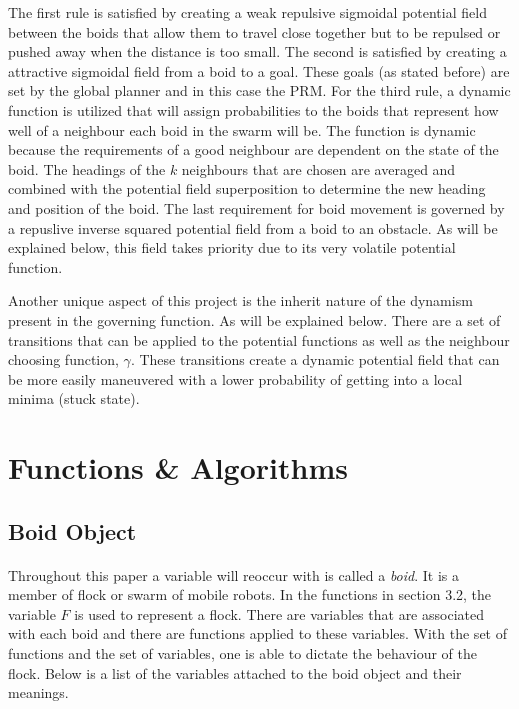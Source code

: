 \documentclass[12pt]{article}
\begin{document}
The first rule is satisfied by creating a weak repulsive sigmoidal potential field between the boids that allow them to travel close together but to be repulsed or pushed away when the distance is too small. The second is satisfied by creating a attractive sigmoidal field from a boid to a goal. These goals (as stated before) are set by the global planner and in this case the PRM. For the third rule, a dynamic function is utilized that will assign probabilities to the boids that represent how well of a neighbour each boid in the swarm will be. The function is dynamic because the requirements of a good neighbour are dependent on the state of the boid. The headings of the \(k\) neighbours that are chosen are averaged and combined with the potential field superposition to determine the new heading and position of the boid. The last requirement for boid movement is governed by a repuslive inverse squared potential field from a boid to an obstacle. As will be explained below, this field takes priority due to its very volatile potential function.

Another unique aspect of this project is the inherit nature of the dynamism present in the governing function. As will be explained below. There are a set of transitions that can be applied to the potential functions as well as the neighbour choosing function, \(\gamma\). These transitions create a dynamic potential field that can be more easily maneuvered with a lower probability of getting into a local minima (stuck state).  

\section{Functions \& Algorithms}

\subsection{Boid Object}
\paragraph{} Throughout this paper a variable will reoccur with is called a \textit{boid}. It is a member of flock or swarm of mobile robots. In the functions in section 3.2, the variable \(F\) is used to represent a flock. There are variables that are associated with each boid and there are functions applied to these variables. With the set of functions and the set of variables, one is able to dictate the behaviour of the flock. Below is a list of the variables attached to the boid object and their meanings.
\end{document}
